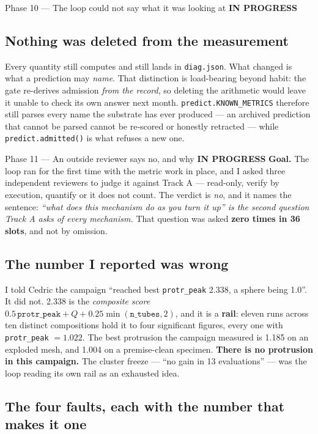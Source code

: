 \documentclass[11pt,a4paper]{article}
\newcommand{\code}[1]{\texttt{#1}}
\newcommand{\prog}{\textcolor{warn}{\textbf{IN PROGRESS}}}
\begin{document}
\begin{phasebox}{Phase 10 --- The loop could not say what it was looking at \hfill \prog}
\subsection*{Nothing was deleted from the measurement}
Every quantity still computes and still lands in \code{diag.json}. What changed is what a
prediction may \emph{name}. That distinction is load-bearing beyond habit: the gate re-derives
admission \emph{from the record}, so deleting the arithmetic would leave it unable to check its own
answer next month. \code{predict.KNOWN\_METRICS} therefore still parses every name the substrate
has ever produced --- an archived prediction that cannot be parsed cannot be re-scored or honestly
retracted --- while \code{predict.admitted()} is what refuses a new one.
\end{phasebox}

\begin{phasebox}{Phase 11 --- An outside reviewer says no, and why \hfill \prog}
\textbf{Goal.} The loop ran for the first time with the metric work in place, and I asked three
independent reviewers to judge it against Track A --- read-only, verify by execution, quantify or
it does not count. The verdict is \emph{no}, and it names the sentence: \emph{``what does this
mechanism do as you turn it up'' is the second question Track A asks of every mechanism.} That
question was asked \textbf{zero times in 36 slots}, and not by omission.

\subsection*{The number I reported was wrong}
I told Cedric the campaign ``reached best \code{protr\_peak} 2.338, a sphere being 1.0''. It did
not. 2.338 is the \emph{composite score} $0.5\,\code{protr\_peak} + Q + 0.25\min(\code{n\_tubes},2)$,
and it is a \textbf{rail}: eleven runs across ten distinct compositions hold it to four significant
figures, every one with \code{protr\_peak} $=1.022$. The best protrusion the campaign measured is
1.185 on an exploded mesh, and 1.004 on a premise-clean specimen. \textbf{There is no protrusion in
this campaign.} The cluster freeze --- ``no gain in 13 evaluations'' --- was the loop reading its
own rail as an exhausted idea.

\subsection*{The four faults, each with the number that makes it one}


\end{phasebox}
\end{document}
